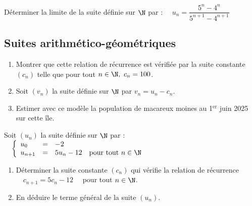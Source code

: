 \documentclass[a4paper,11pt,exos]{nsi} %
\begin{document}
\exo{ \faSplotch}
Déterminer la limite de la suite définie sur $\N$ par : $\quad u_n = \dfrac{5^n-4^n}{5^{n+1}-4^{n+1}}$

\subsection*{Suites arithmético-géométriques}

\begin{enumerate}
    \item Montrer que cette relation de récurrence est vérifiée par la suite constante $(c_n)$ telle que pour tout $n\in\N, \ c_n=100$.
    \item Soit $(v_n)$ la suite définie sur $\N$ par $v_n=u_n-c_n$.
    \item Estimer avec ce modèle la population de macareux moines au 1$^{\text{er}}$ juin 2025 sur cette île.
\end{enumerate}

\exo{}
Soit $(u_n)$ la suite définie sur $\N$ par : 
$\quad \left\{
    \begin{array}{llll}
        u_0 & = & -2 & \\
        u_{n+1} & = & 5u_n-12 & \text{pour tout } n\in\N\\
    \end{array}
\right. $
\begin{enumerate}
    \item Déterminer la suite constante $(c_n)$ qui vérifie la relation de récurrence $\quad c_{n+1}=5c_n-12\quad$ pour tout $n\in\N$.
    \item En déduire le terme général de la suite $(u_n)$.
\end{enumerate}
\end{document}
